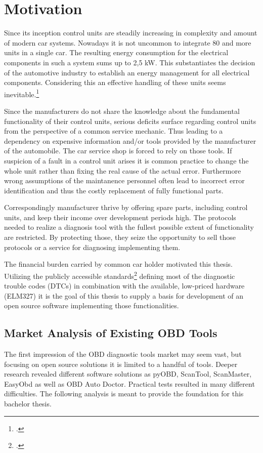 
\chapter{Motivation}

Since its inception control units are steadily increasing in complexity and amount of modern car systems. Nowadays it is not uncommon to 
integrate 80 and more units in a single car. The resulting energy consumption for the electrical components in such a system sums up to 2,5 kW.
This substantiates the decision of the automotive industry to establish an energy management for all electrical components. Considering this an 
effective handling of these units seems inevitable.\footcite{SCHAFFOBD1} 

Since the manufacturers do not share the knowledge about the fundamental 
functionality of their control units, serious deficits surface regarding control units from the perspective 
of a common service mechanic. Thus leading to a dependency on expensive information and/or tools provided by the manufacturer of the automobile.
The car service shop is forced to rely on those tools. If suspicion of a fault in a control unit arises it is common practice to change the whole 
unit rather than fixing the real cause of the actual error. Furthermore wrong assumptions of the maintanence personnel often lead to incorrect 
error identification and thus the costly replacement of fully functional parts.

Correspondingly manufacturer thrive by offering spare parts, including control units, and keep their income over development periods high. The 
protocols needed to realize a diagnosis tool with the fullest possible extent of functionality are restricted. By protecting those, they seize the 
opportunity to sell those protocols or a service for diagnosing implementing them. 

The financial burden carried by common car holder motivated this thesis. Utilizing the publicly accessible standards\footcite{ISO15031} defining most of the diagnostic 
trouble codes (DTCs) in combination with the available, low-priced hardware (ELM327) it is the goal of this thesis to supply a basis for development of 
an open source software implementing those functionalities.

\section{Market Analysis of Existing OBD Tools}
The first impression of the OBD diagnostic tools market may seem vast, but focusing on open source solutions it is limited to a handful of tools.
Deeper research revealed different software solutions as pyOBD, ScanTool, ScanMaster, EasyObd as well as OBD Auto Doctor. 
Practical tests resulted in many different difficulties. The following analysis is meant to provide the foundation for this bachelor 
thesis. 

